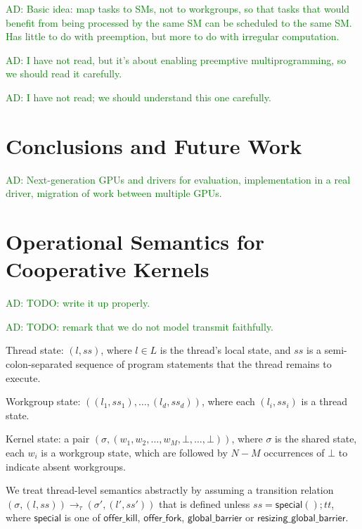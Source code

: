 \documentclass[numbers,nocopyrightspace,10pt]{sigplanconf}
\newcommand{\ADComment}[1]{\textcolor{green}{AD: #1}}
\newcommand{\offerfork}{\mathsf{offer\_fork}}
\newcommand{\offerkill}{\mathsf{offer\_kill}}
\newcommand{\globalbarrier}{\mathsf{global\_barrier}}
\newcommand{\resizingglobalbarrier}{\mathsf{resizing\_global\_barrier}}
\begin{document}
\cite{DBLP:conf/ics/WuCLSV15} \ADComment{Basic idea: map tasks to
  SMs, not to workgroups, so that tasks that would benefit from being
  processed by the same SM can be scheduled to the same SM.  Has
  little to do with preemption, but more to do with irregular
  computation.}

\cite{DBLP:conf/isca/TanasicGCRNV14} \ADComment{I have not read, but
  it's about enabling preemptive multiprogramming, so we should read
  it carefully.}

\cite{DBLP:conf/ppopp/Muyan-OzcelikO16} \ADComment{I have not read; we
  should understand this one carefully.}


\section{Conclusions and Future Work}\label{sec:conclusion}

\ADComment{Next-generation GPUs and drivers for evaluation,
  implementation in a real driver, migration of work between multiple
  GPUs.}

\clearpage




\appendix

\section{Operational Semantics for Cooperative Kernels}\label{appendix:semantics}

\ADComment{TODO: write it up properly.}

\ADComment{TODO: remark that we do not model transmit faithfully.}

Thread state: $(l, \mathit{ss})$, where $l \in L$ is the thread's
local state, and $\mathit{ss}$ is a semi-colon-separated sequence of
program statements that the thread remains to execute.

Workgroup state: $((l_1, \mathit{ss}_1), \dots, (l_d,
\mathit{ss}_d))$, where each $(l_i, \mathit{ss}_i)$ is a thread state.

Kernel state: a pair $(\sigma, (w_1, w_2, \dots, w_M, \bot, \dots, \bot))$, where $\sigma$ is the shared state,
each $w_i$ is a workgroup state, which are
followed by $N-M$ occurrences of $\bot$ to indicate absent workgroups.

We treat thread-level semantics abstractly by assuming a transition
relation $(\sigma, (l, \mathit{ss})) \rightarrow_{\tau} (\sigma', (l',
\mathit{ss}'))$ that is defined unless $\mathit{ss} =
\mathsf{special}(); \mathit{tt}$, where $\mathsf{special}$ is one of
$\offerkill$, $\offerfork$, $\globalbarrier$ or
$\resizingglobalbarrier$.
\end{document}
